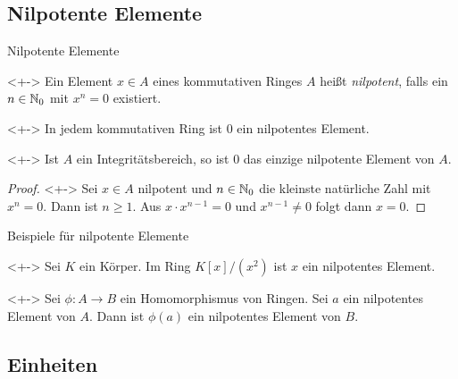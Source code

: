 \subsection{Nilpotente Elemente}

\begin{frame}{Nilpotente Elemente}
    \begin{definition}<+->
        Ein Element \(x \in A\) eines kommutativen Ringes \(A\) heißt
        \emph{nilpotent}, falls ein \(n \in \mathbb N_0\)
        mit \(x^n = 0\) existiert.
    \end{definition}
    \begin{example}<+->
        In jedem kommutativen Ring ist \(0\) ein nilpotentes Element.
    \end{example}
    \begin{proposition}<+->
        Ist \(A\) ein Integritätsbereich, so ist \(0\) das einzige nilpotente Element
        von \(A\).
    \end{proposition}
    \begin{proof}<+->
        Sei \(x \in A\) nilpotent und \(n \in \mathbb N_0\) die kleinste natürliche Zahl
        mit \(x^n = 0\). Dann ist \(n \ge 1\). Aus \(x \cdot x^{n - 1} = 0\)
        und \(x^{n - 1} \neq 0\)
        folgt dann \(x = 0\).
    \end{proof}
\end{frame}

\begin{frame}{Beispiele für nilpotente Elemente}
    \begin{example}<+->
        Sei \(K\) ein Körper. Im Ring \(K[x]/(x^2)\) ist \(x\) ein nilpotentes
        Element.
    \end{example}
    \begin{example}<+->
        Sei \(\phi\colon A \to B\) ein Homomorphismus von Ringen. Sei \(a\) ein
        nilpotentes Element von \(A\). Dann ist \(\phi(a)\) ein nilpotentes Element
        von \(B\).
    \end{example}
\end{frame}

\subsection{Einheiten}

